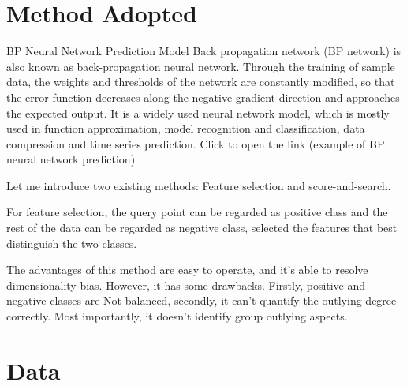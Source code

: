\documentclass[
 size=14pt,
 paper=smartboard,  %
 mode=present, 		%
 display=slides, 	%
 style=tuliplab,  	%
 pauseslide,
 fleqn,leqno]{powerdot}
\begin{document}
\section{Method Adopted}


\begin{slide}{BP Neural Network Prediction Model}
Back propagation network (BP network) is also known as back-propagation neural network. 
Through the training of sample data, the weights and thresholds of the network are constantly modified, 
so that the error function decreases along the negative gradient direction and approaches the expected output.  
It is a widely used neural network model, which is mostly used in function approximation, 
model recognition and classification, data compression and time series prediction. Click to open the link (example of BP neural network prediction)






\begin{note}
Let me introduce two existing methods:
Feature selection and score-and-search.

For feature selection,
the query point can be regarded as positive class and
the rest of the data can be regarded as negative class,
selected the features that best distinguish the two classes.

The advantages of this method are easy to operate,
and it's able to resolve dimensionality bias.
However, it has some drawbacks.
Firstly,
positive and negative classes are Not balanced,
secondly,
it can't quantify the outlying degree correctly.
Most importantly,
it doesn't identify group outlying aspects.
\end{note}

\end{slide}


\section{Data}
\end{document}

